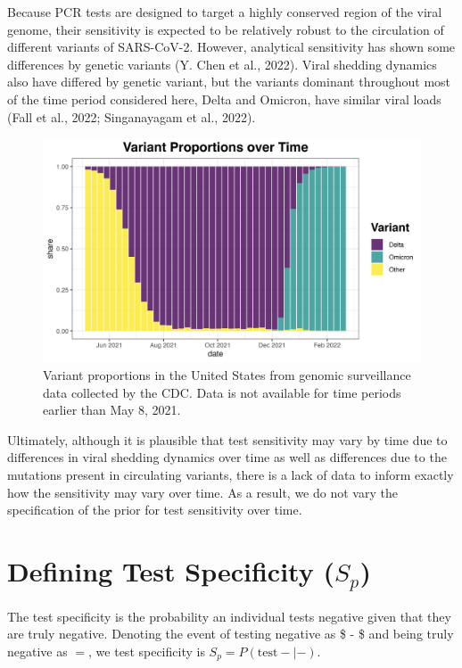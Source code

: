 \documentclass[12pt,twoside]{smiththesis}
\begin{document}
Because PCR tests are designed to target a highly conserved region of the viral genome, their sensitivity is expected to be relatively robust to the circulation of different variants of SARS-CoV-2. However, analytical sensitivity has shown some differences by genetic variants (Y. Chen et al., 2022). Viral shedding dynamics also have differed by genetic variant, but the variants dominant throughout most of the time period considered here, Delta and Omicron, have similar viral loads (Fall et al., 2022; Singanayagam et al., 2022).
\begin{figure}

{\centering \includegraphics[width=0.8\linewidth]{./figure/variant_plot} 

}

\caption{Variant proportions in the United States from genomic surveillance data collected by the CDC. Data is not available for time periods earlier than May 8, 2021.}\label{fig:unnamed-chunk-49}
\end{figure}
Ultimately, although it is plausible that test sensitivity may vary by time due to differences in viral shedding dynamics over time as well as differences due to the mutations present in circulating variants, there is a lack of data to inform exactly how the sensitivity may vary over time. As a result, we do not vary the specification of the prior for test sensitivity over time.

\hypertarget{defining-test-specificity-s_p}{%
\section{\texorpdfstring{Defining Test Specificity (\(S_p\))}{Defining Test Specificity (S\_p)}}\label{defining-test-specificity-s_p}}

The test specificity is the probability an individual tests negative given that they are truly negative. Denoting the event of testing negative as \$ - \$ and being truly negative as \(=\), we test specificity is \(S_p = P(\text{test} - | -)\).
\end{document}
